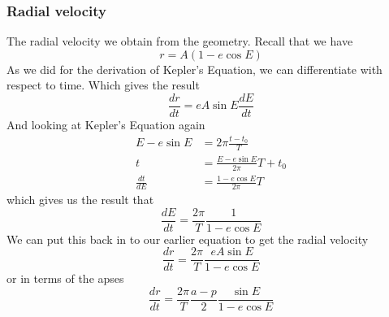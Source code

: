 \subsubsection{Radial velocity}
The radial velocity we obtain from the geometry. Recall that we have
\begin{equation}
r=A(1-e\cos E)
\end{equation}
As we did for the derivation of Kepler's Equation, we can differentiate with respect to time. Which gives the result
\begin{equation}
\frac{dr}{dt} =eA \sin E \frac{dE}{dt}
\end{equation}
And looking at Kepler's Equation again
\begin{align*}
E-e\sin E &= 2\pi\frac{t-t_0}{T}\\
t&=\frac{E-e\sin E}{2\pi}T+t_0\\
\frac{dt}{dE}&=\frac{1-e\cos E}{2\pi}T
\end{align*}
which gives us the result that
\begin{equation}
\frac{dE}{dt}=\frac{2\pi}{T}\frac{1}{1-e\cos E}
\end{equation}
We can put this back in to our earlier equation to get the radial velocity
\begin{equation}
\frac{dr}{dt} = \frac{2\pi}{T}\frac{ eA \sin E}{1-e\cos E}
\end{equation}
or in terms of the apses
\begin{equation}
\frac{dr}{dt} = \frac{2\pi}{T}\frac{a-p}{2}\frac{\sin E}{1-e\cos E}
\end{equation}